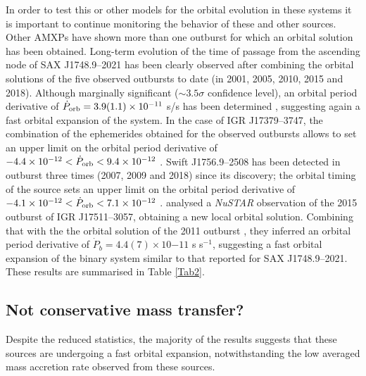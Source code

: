 \documentclass[graybox]{svmult}
\def \nustar{{\em NuSTAR\xspace}}
\begin{document}
In order to test this or other models for the orbital evolution in these systems it is important to continue monitoring the behavior of these and other sources. Other AMXPs have shown more than one outburst for which an orbital solution has been obtained. Long-term evolution of the time of passage from the ascending node of SAX J1748.9--2021 has been clearly observed after combining the orbital solutions of the five observed outbursts to date (in 2001, 2005, 2010, 2015 and 2018). Although marginally significant ($\sim 3.5 \sigma$ confidence level), an orbital period derivative of $\dot{P}_{\rm orb}=3.9(1.1)\times 10^{-11}$ s/s has been determined \cite{Sanna2020}, suggesting again a fast orbital expansion of the system. In the case of IGR J17379--3747, the combination of the ephemerides obtained for the observed outbursts allows to set an upper limit on the orbital period derivative of $-4.4\times10^{-12} < \dot{P}_{\rm orb} < 9.4\times 10^{-12}$ \cite{Sanna2018b}. Swift J1756.9--2508 has been detected in outburst three times (2007, 2009 and 2018) since its discovery; the orbital timing of the source sets an upper limit on the orbital period derivative of $-4.1 \times 10^{-12} < \dot{P}_{\rm orb} < 7.1 \times 10^{-12}$ \cite{Sanna2019}. \cite{Riggio2020} analysed a \nustar{} observation of the 2015 outburst of IGR J17511--3057, obtaining a new local orbital solution. Combining that with the the orbital solution of the 2011 outburst \cite{Riggio2011}, they inferred an orbital period derivative of $\dot{P}_b = 4.4(7) \times 10{-11}$ s s$^{-1}$, suggesting a fast orbital expansion of the binary system similar to that reported for SAX J1748.9--2021. These results are summarised in Table \ref{Tab2}.

\subsection{Not conservative mass transfer?}

Despite the reduced statistics, the majority of the results suggests that these sources are undergoing a fast orbital expansion, notwithstanding the low averaged mass accretion rate observed from these sources.
\end{document}
